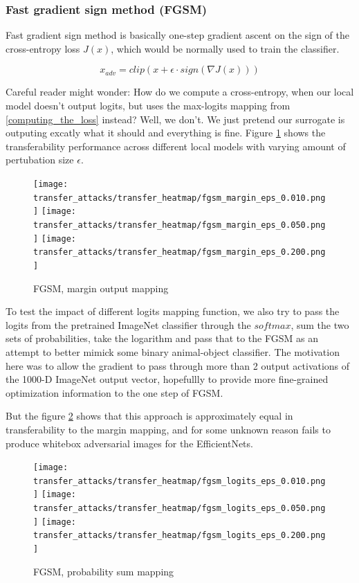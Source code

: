 \subsubsection{Fast gradient sign method (FGSM)}
Fast gradient sign method is basically one-step gradient ascent on the sign of the cross-entropy loss $J(x)$, which would be normally used to train the classifier.

$$x_{adv} = clip(x + \epsilon \cdot sign(\nabla J(x)))$$


Careful reader might wonder: How do we compute a cross-entropy, when our local model doesn't output logits, but uses the max-logits mapping from \ref{computing_the_loss} instead? Well, we don't. We just pretend our surrogate is outputing excatly what it should and everything is fine. Figure \ref{fig:fgsm_margin} shows the transferability performance across different local models with varying amount of pertubation size $\epsilon$.

\begin{figure}[!htb]
  \texttt{[image: transfer\_attacks/transfer\_heatmap/fgsm\_margin\_eps\_0.010.png]}
\endminipage\hfill
{}
  \texttt{[image: transfer\_attacks/transfer\_heatmap/fgsm\_margin\_eps\_0.050.png]}
\endminipage\hfill
{}%
  \texttt{[image: transfer\_attacks/transfer\_heatmap/fgsm\_margin\_eps\_0.200.png]}
\endminipage
\caption{FGSM, margin output mapping}
\label{fig:fgsm_margin}
\end{figure}

To test the impact of different logits mapping function, we also try to pass the logits from the pretrained ImageNet classifier through the $softmax$, sum the two sets of probabilities, take the logarithm and pass that to the FGSM as an attempt to better mimick some binary animal-object classifier. The motivation here was to allow the gradient to pass through more than 2 output activations of the 1000-D ImageNet output vector, hopefullly to provide more fine-grained optimization information to the one step of FGSM.

But the figure \ref{fig:fgsm_prob_sum} shows that this approach is approximately equal in transferability to the margin mapping, and for some unknown reason fails to produce whitebox adversarial images for the EfficientNets.

\begin{figure}[!htb]
  \texttt{[image: transfer\_attacks/transfer\_heatmap/fgsm\_logits\_eps\_0.010.png]}
\endminipage\hfill
{}
  \texttt{[image: transfer\_attacks/transfer\_heatmap/fgsm\_logits\_eps\_0.050.png]}
\endminipage\hfill
{}%
  \texttt{[image: transfer\_attacks/transfer\_heatmap/fgsm\_logits\_eps\_0.200.png]}
\endminipage
\caption{FGSM, probability sum mapping}
\label{fig:fgsm_prob_sum}
\end{figure}


